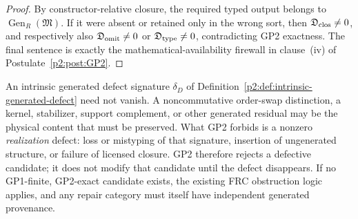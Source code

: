 \documentclass[12pt,a4paper]{article}
\begin{document}
\begin{proof}
By constructor-relative closure, the required typed output belongs to
\(\operatorname{Gen}_R(\mathfrak M)\).  If it were absent or retained only in
the wrong sort, then
\(\mathfrak D_{\rm clos}\ne0\), and respectively also
\(\mathfrak D_{\rm omit}\ne0\) or
\(\mathfrak D_{\rm type}\ne0\), contradicting GP2 exactness.  The final
sentence is exactly the mathematical-availability firewall in clause~(iv) of
Postulate~\ref{p2:post:GP2}.
\end{proof}

\begin{remark}
\label{p2:rem:defect-preservation-vs-realization-defect}
An intrinsic generated defect signature \(\delta_D\) of
Definition~\ref{p2:def:intrinsic-generated-defect} need not vanish.  A
noncommutative order-swap distinction, a kernel, stabilizer, support
complement, or other generated residual may be the physical content that must
be preserved.  What GP2 forbids is a nonzero \emph{realization} defect: loss or
mistyping of that signature, insertion of ungenerated structure, or failure of
licensed closure.  GP2 therefore rejects a defective candidate; it does not
modify that candidate until the defect disappears.  If no GP1-finite,
GP2-exact candidate exists, the existing FRC obstruction logic applies, and
any repair category must itself have independent generated provenance.
\end{remark}
\end{document}
